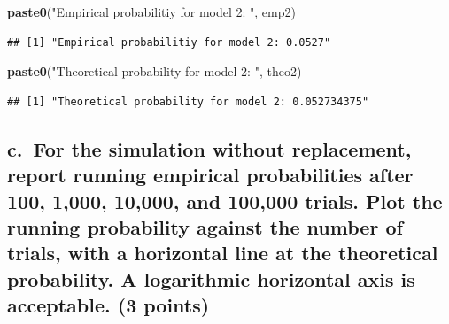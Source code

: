 \documentclass[
]{article}
\newenvironment{Shaded}{\begin{snugshade}}{\end{snugshade}}
\newcommand{\FunctionTok}[1]{\textcolor[rgb]{0.13,0.29,0.53}{\textbf{#1}}}
\newcommand{\NormalTok}[1]{#1}
\newcommand{\StringTok}[1]{\textcolor[rgb]{0.31,0.60,0.02}{#1}}
\begin{document}
\begin{Shaded}
\begin{Highlighting}[]
\FunctionTok{paste0}\NormalTok{(}\StringTok{"Empirical probabilitiy for model 2: "}\NormalTok{, emp2)}
\end{Highlighting}
\end{Shaded}

\begin{verbatim}
## [1] "Empirical probabilitiy for model 2: 0.0527"
\end{verbatim}

\begin{Shaded}
\begin{Highlighting}[]
\FunctionTok{paste0}\NormalTok{(}\StringTok{"Theoretical probability for model 2: "}\NormalTok{, theo2)}
\end{Highlighting}
\end{Shaded}

\begin{verbatim}
## [1] "Theoretical probability for model 2: 0.052734375"
\end{verbatim}

\subsection{c.~For the simulation without replacement, report running
empirical probabilities after 100, 1,000, 10,000, and 100,000 trials.
Plot the running probability against the number of trials, with a
horizontal line at the theoretical probability. A logarithmic horizontal
axis is acceptable. (3
points)}\label{c.-for-the-simulation-without-replacement-report-running-empirical-probabilities-after-100-1000-10000-and-100000-trials.-plot-the-running-probability-against-the-number-of-trials-with-a-horizontal-line-at-the-theoretical-probability.-a-logarithmic-horizontal-axis-is-acceptable.-3-points}
\end{document}
